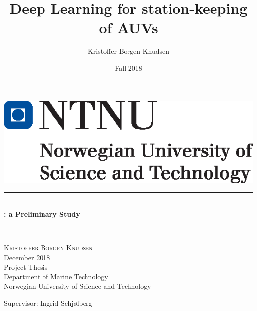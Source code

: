 \documentclass[12pt]{report}
\title{Deep Learning for station-keeping of AUVs}		%
\author{Kristoffer Borgen Knudsen}								%
\date{Fall 2018}											%
\makeatletter
\let\thetitle\@title
\makeatother
\begin{document}

\begin{titlepage}
    \thispagestyle{empty}
    \includegraphics[left]{logo.eps}	%
    \mbox{}\\[6pc]
	\begin{center}
    \vspace*{0.5 cm}
    
    
    \rule{\linewidth}{0.5 mm} \\[0.4 cm]
	{ \huge \bfseries \thetitle : a Preliminary Study}\\
	\rule{\linewidth}{0.5 mm} \\[1.5 cm]
	
	
	\textsc{\Large Kristoffer Borgen Knudsen}\\[0.5 cm]
	\Large{December 2018}\\[1.5 cm]
	Project Thesis\\
	Department of Marine Technology \\
	Norwegian University of Science and Technology
	
	\end{center}
	
	\vfill
	\noindent Supervisor: Ingrid Schjølberg
	
	
    
    
    
    
	
\end{titlepage}


\tableofcontents
\pagebreak












\printglossary[type=\acronymtype,title=Acronyms]

\newpage


\end{document}
